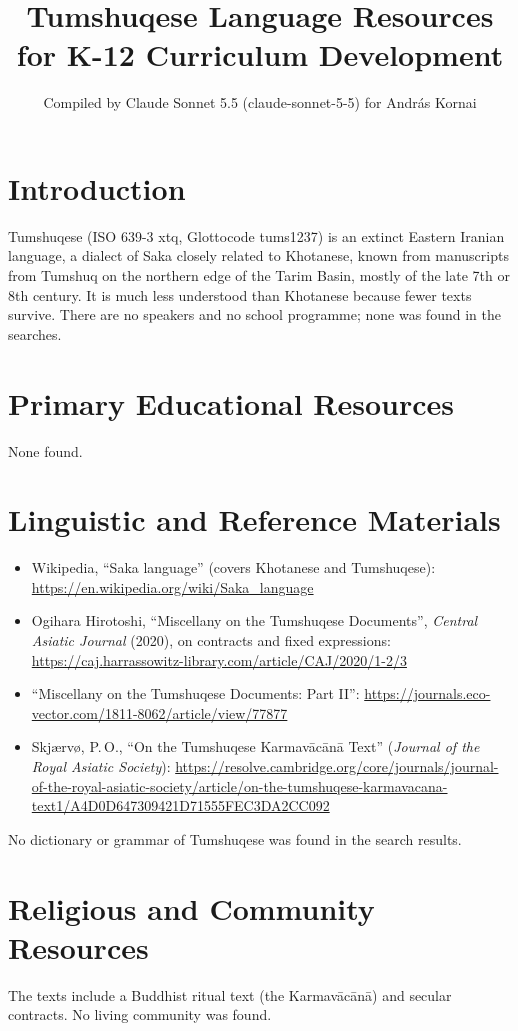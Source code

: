 \documentclass[12pt]{article}
\title{Tumshuqese Language Resources for K-12 Curriculum Development}
\author{Compiled by Claude Sonnet 5.5 (claude-sonnet-5-5) for Andr\'as Kornai}
\date{}
\begin{document}
\maketitle

\section{Introduction}
Tumshuqese (ISO 639-3 xtq, Glottocode tums1237) is an extinct Eastern Iranian language, a dialect of Saka closely related to Khotanese, known from manuscripts from Tumshuq on the northern edge of the Tarim Basin, mostly of the late 7th or 8th century. It is much less understood than Khotanese because fewer texts survive. There are no speakers and no school programme; none was found in the searches.

\section{Primary Educational Resources}
None found.

\section{Linguistic and Reference Materials}
\begin{itemize}
\item Wikipedia, ``Saka language'' (covers Khotanese and Tumshuqese): \url{https://en.wikipedia.org/wiki/Saka_language}
\item Ogihara Hirotoshi, ``Miscellany on the Tumshuqese Documents'', \emph{Central Asiatic Journal} (2020), on contracts and fixed expressions: \url{https://caj.harrassowitz-library.com/article/CAJ/2020/1-2/3}
\item ``Miscellany on the Tumshuqese Documents: Part II'': \url{https://journals.eco-vector.com/1811-8062/article/view/77877}
\item Skj\ae rv\o, P.\,O., ``On the Tumshuqese Karmav\=ac\=an\=a Text'' (\emph{Journal of the Royal Asiatic Society}): \url{https://resolve.cambridge.org/core/journals/journal-of-the-royal-asiatic-society/article/on-the-tumshuqese-karmavacana-text1/A4D0D647309421D71555FEC3DA2CC092}
\end{itemize}
No dictionary or grammar of Tumshuqese was found in the search results.

\section{Religious and Community Resources}
The texts include a Buddhist ritual text (the Karmav\=ac\=an\=a) and secular contracts. No living community was found.
\end{document}
